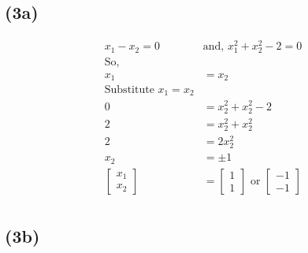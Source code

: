 \documentclass{article}
\begin{document}
\subsection*{(3a)}

\begin{align*}
    x_1 - x_2 = 0 \quad &\text{and, }x_1^2 + x_2^2 - 2 =0\\
    \text{So,}&\\
    x_1 &= x_2 \\
    \text{Substitute $x_1 = x_2 $}&\\
    0 &= x_2^2 + x_2^2 - 2\\
    2 &= x_2^2 + x_2^2\\
    2 &= 2x_2^2\\
    x_2 &= \pm 1\\
    \begin{bmatrix} x_1 \\ x_2 \end{bmatrix} &= \begin{bmatrix} 1 \\ 1 \end{bmatrix} \text{ or } \begin{bmatrix} -1 \\ -1 \end{bmatrix}\\
\end{align*}

\subsection*{(3b)}
\end{document}
